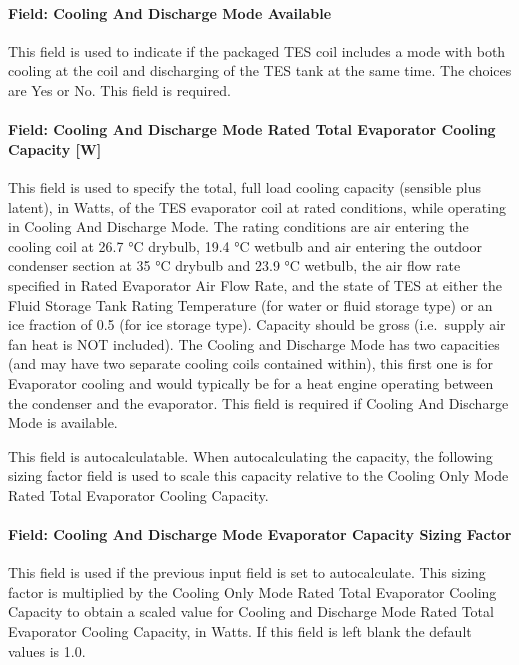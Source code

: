 \paragraph{Field: Cooling And Discharge Mode Available}\label{field-cooling-and-discharge-mode-available}

This field is used to indicate if the packaged TES coil includes a mode with both cooling at the coil and discharging of the TES tank at the same time. The choices are Yes or No. This field is required.

\paragraph{Field: Cooling And Discharge Mode Rated Total Evaporator Cooling Capacity {[}W{]}}\label{field-cooling-and-discharge-mode-rated-total-evaporator-cooling-capacity-w}

This field is used to specify the total, full load cooling capacity (sensible plus latent), in Watts, of the TES evaporator coil at rated conditions, while operating in Cooling And Discharge Mode. The rating conditions are air entering the cooling coil at 26.7 °C drybulb, 19.4 °C wetbulb and air entering the outdoor condenser section at 35 °C drybulb and 23.9 °C wetbulb, the air flow rate specified in Rated Evaporator Air Flow Rate, and the state of TES at either the Fluid Storage Tank Rating Temperature (for water or fluid storage type) or an ice fraction of 0.5 (for ice storage type). Capacity should be gross (i.e.~supply air fan heat is NOT included). The Cooling and Discharge Mode has two capacities (and may have two separate cooling coils contained within), this first one is for Evaporator cooling and would typically be for a heat engine operating between the condenser and the evaporator. This field is required if Cooling And Discharge Mode is available.

This field is autocalculatable. When autocalculating the capacity, the following sizing factor field is used to scale this capacity relative to the Cooling Only Mode Rated Total Evaporator Cooling Capacity.

\paragraph{Field: Cooling And Discharge Mode Evaporator Capacity Sizing Factor}\label{field-cooling-and-discharge-mode-evaporator-capacity-sizing-factor}

This field is used if the previous input field is set to autocalculate. This sizing factor is multiplied by the Cooling Only Mode Rated Total Evaporator Cooling Capacity to obtain a scaled value for Cooling and Discharge Mode Rated Total Evaporator Cooling Capacity, in Watts. If this field is left blank the default values is 1.0.

